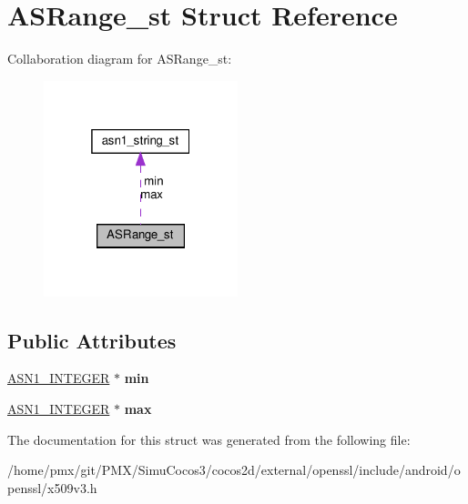 \hypertarget{structASRange__st}{}\section{A\+S\+Range\+\_\+st Struct Reference}
\label{structASRange__st}


Collaboration diagram for A\+S\+Range\+\_\+st\+:
\nopagebreak
\begin{figure}[H]
\begin{center}
\leavevmode
\includegraphics[width=160pt]{structASRange__st__coll__graph}
\end{center}
\end{figure}
\subsection*{Public Attributes}
\begin{DoxyCompactItemize}
\item 
\mbox{\label{structASRange__st_aff589fbfcb1ff63fd0465ed0dcc551de}} 
\hyperlink{structasn1__string__st}{A\+S\+N1\+\_\+\+I\+N\+T\+E\+G\+ER} $\ast$ {\bfseries min}
\item 
\mbox{\label{structASRange__st_a1a433ce24ae5c115b8fb4f4c5d099def}} 
\hyperlink{structasn1__string__st}{A\+S\+N1\+\_\+\+I\+N\+T\+E\+G\+ER} $\ast$ {\bfseries max}
\end{DoxyCompactItemize}


The documentation for this struct was generated from the following file\+:\begin{DoxyCompactItemize}
\item 
/home/pmx/git/\+P\+M\+X/\+Simu\+Cocos3/cocos2d/external/openssl/include/android/openssl/x509v3.\+h\end{DoxyCompactItemize}
